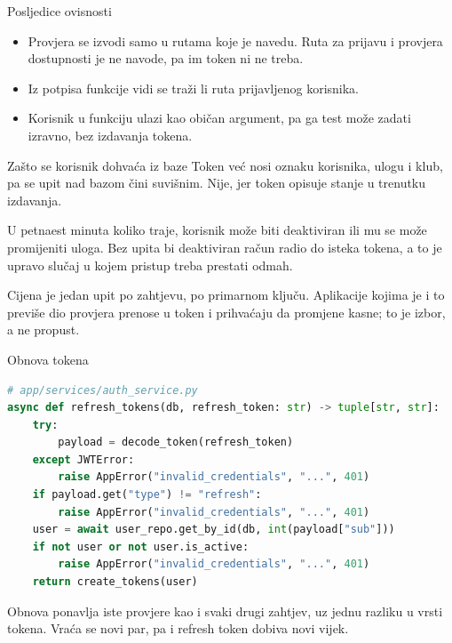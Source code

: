 \begin{frame}{Posljedice ovisnosti}
\begin{itemize}
  \setlength{\itemsep}{1.4em}
  \item Provjera se izvodi samo u rutama koje je navedu. Ruta za prijavu i provjera dostupnosti je ne navode, pa im token ni ne treba.
  \item Iz potpisa funkcije vidi se traži li ruta prijavljenog korisnika.
  \item Korisnik u funkciju ulazi kao običan argument, pa ga test može zadati izravno, bez izdavanja tokena.
\end{itemize}
\end{frame}

\begin{frame}{Zašto se korisnik dohvaća iz baze}
Token već nosi oznaku korisnika, ulogu i klub, pa se upit nad bazom čini suvišnim. Nije, jer token opisuje stanje u trenutku izdavanja.

\vspace{1.1em}
U petnaest minuta koliko traje, korisnik može biti deaktiviran ili mu se može promijeniti uloga. Bez upita bi deaktiviran račun radio do isteka tokena, a to je upravo slučaj u kojem pristup treba prestati odmah.

\vspace{1.1em}
Cijena je jedan upit po zahtjevu, po primarnom ključu. Aplikacije kojima je i to previše dio provjera prenose u token i prihvaćaju da promjene kasne; to je izbor, a ne propust.
\end{frame}


\begin{frame}[fragile]{Obnova tokena}
\begin{lstlisting}[language=python]
# app/services/auth_service.py
async def refresh_tokens(db, refresh_token: str) -> tuple[str, str]:
    try:
        payload = decode_token(refresh_token)
    except JWTError:
        raise AppError("invalid_credentials", "...", 401)
    if payload.get("type") != "refresh":
        raise AppError("invalid_credentials", "...", 401)
    user = await user_repo.get_by_id(db, int(payload["sub"]))
    if not user or not user.is_active:
        raise AppError("invalid_credentials", "...", 401)
    return create_tokens(user)
\end{lstlisting}

\vspace{0.2em}
Obnova ponavlja iste provjere kao i svaki drugi zahtjev, uz jednu razliku u vrsti tokena. Vraća se novi par, pa i refresh token dobiva novi vijek.
\end{frame}

